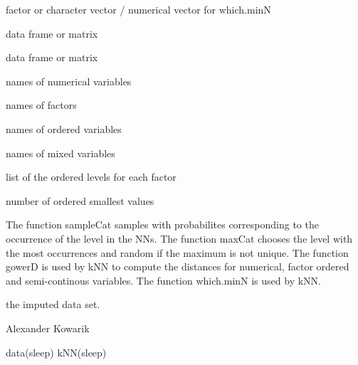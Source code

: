 \begin{Arguments}
\begin{ldescription}
\item[\code{x}] 
factor or character vector / numerical vector for which.minN

\item[\code{data.x}] 
data frame or matrix    

\item[\code{data.y}] 
data frame or matrix

\item[\code{numerical}] 
names of numerical variables

\item[\code{factors}] 
names of factors

\item[\code{orders}] 
names of ordered variables

\item[\code{mixed}] 
names of mixed variables

\item[\code{levOrders}] 
list of the ordered levels for each factor

\item[\code{n}] 
number of ordered smallest values

\end{ldescription}
\end{Arguments}
%
\begin{Details}\relax
The function sampleCat samples with probabilites corresponding to the occurrence of the level in the NNs.
The function maxCat chooses the level with the most occurrences and random if the maximum is not unique.
The function gowerD is used by kNN to compute the distances for numerical, factor ordered and semi-continous variables.
The function which.minN is used by kNN.
\end{Details}
%
\begin{Value}
the imputed data set.
\end{Value}
%
\begin{Author}\relax
Alexander Kowarik
\end{Author}
%
\begin{Examples}
\begin{ExampleCode}
data(sleep)
kNN(sleep)
\end{ExampleCode}
\end{Examples}
